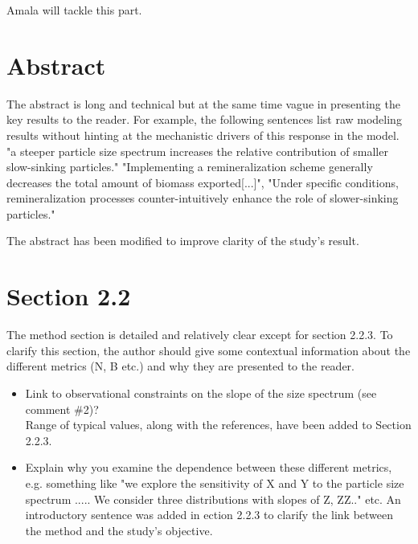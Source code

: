 \documentclass[12pt,letter]{article}
\begin{document}
{\color{red} Amala will tackle this part.}

\section*{Abstract}
The abstract is long and technical but at the same time vague in presenting the key results to the reader. For example, the following sentences list raw modeling results without hinting at the mechanistic drivers of this response in the model.
"a steeper particle size spectrum increases the relative contribution of smaller slow-sinking particles." "Implementing a remineralization scheme generally decreases the total amount of biomass exported[...]", "Under specific conditions, remineralization processes counter-intuitively enhance the role of slower-sinking particles."

{\color{blue}The abstract has been modified to improve clarity of the study's result.\\}

\section*{Section 2.2}
The method section is detailed and relatively clear except for section 2.2.3. To clarify this section, the author should give some contextual information about the different metrics (N, B etc.) and why they are presented to the reader.
\begin{itemize}
	\item Link to observational constraints on the slope of the size spectrum (see comment \#2)?\\
	{\color{blue} Range of typical values, along with the references, have been added to Section 2.2.3.\\}

	\item Explain why you examine the dependence between these different metrics, e.g. something like "we explore the sensitivity of X and Y to the particle size spectrum ..... We consider three distributions with slopes of Z, ZZ.." etc.
		{\color{blue} An introductory sentence was added in ection 2.2.3 to clarify the link between the method and the study's objective.\\}
\end{itemize}
\end{document}
